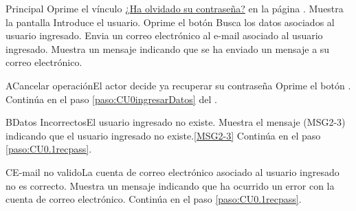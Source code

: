 	\begin{UCtrayectoria}{Principal}
			\UCpaso[\UCactor] Oprime el vínculo \underline{¿Ha olvidado su contraseña?} en la página .
			\UCpaso Muestra la pantalla 	
			\UCpaso [\UCactor] Introduce el usuario.\label{paso:CU0.1recpass}
			\UCpaso [\UCactor] Oprime el botón  
			\UCpaso Busca los datos asociados al usuario ingresado.
			\UCpaso Envia un correo electrónico al e-mail asociado al usuario ingresado.
			\UCpaso Muestra un mensaje indicando que se ha enviado un mensaje a su correo electrónico.
	\end{UCtrayectoria}

		\begin{UCtrayectoriaA}{A}{Cancelar operación}{El actor decide ya recuperar su contraseña}
			\UCpaso[\UCactor] Oprime el botón .
			\UCpaso Continúa en el paso \ref{paso:CU0ingresarDatos} del .
		\end{UCtrayectoriaA}

		\begin{UCtrayectoriaA}{B}{Datos Incorrectos}{El usuario ingresado no existe.}
			\UCpaso Muestra el mensaje (MSG2-3) indicando que el usuario ingresado no existe.\ref{MSG2-3}
			\UCpaso Continúa en el paso \ref{paso:CU0.1recpass}.
		\end{UCtrayectoriaA}

		\begin{UCtrayectoriaA}{C}{E-mail no valido}{La cuenta de correo electrónico asociado al usuario ingresado no es correcto.}
			\UCpaso Muestra un mensaje indicando que ha ocurrido un error con la cuenta de correo electrónico.
			\UCpaso Continúa en el paso \ref{paso:CU0.1recpass}.
		\end{UCtrayectoriaA}